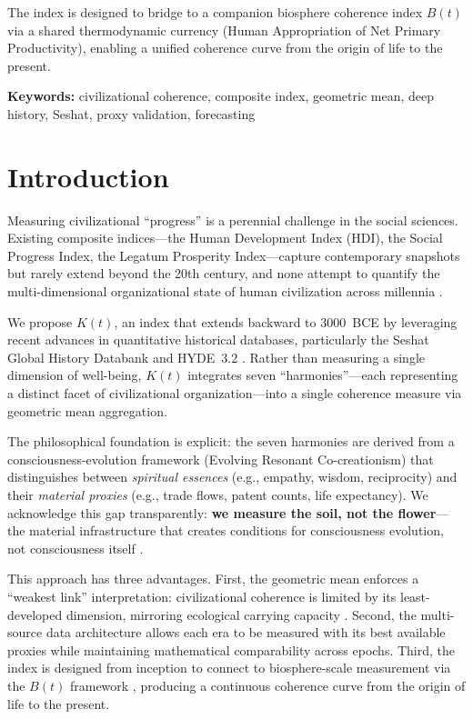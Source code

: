 \documentclass[10pt,letterpaper]{article}
\newcommand{\kt}{$K(t)$}
\begin{document}
The index is designed to bridge to a companion biosphere coherence
index $B(t)$ \cite{stoltz2026bt} via a shared thermodynamic currency
(Human Appropriation of Net Primary Productivity), enabling a unified
coherence curve from the origin of life to the present.

\noindent\textbf{Keywords:} civilizational coherence, composite index,
geometric mean, deep history, Seshat, proxy validation, forecasting

\linenumbers

\section*{Introduction}

Measuring civilizational ``progress'' is a perennial challenge in the
social sciences. Existing composite indices---the Human Development
Index (HDI), the Social Progress Index, the Legatum Prosperity Index---capture
contemporary snapshots but rarely extend beyond the 20th century, and none
attempt to quantify the multi-dimensional organizational state of human
civilization across millennia \cite{undp2020, porter2017}.

We propose \kt{}, an index that extends backward to 3000~BCE by
leveraging recent advances in quantitative historical databases,
particularly the Seshat Global History Databank \cite{turchin2018seshat}
and HYDE~3.2 \cite{goldewijk2017}. Rather than measuring a single
dimension of well-being, \kt{} integrates seven ``harmonies''---each
representing a distinct facet of civilizational organization---into a
single coherence measure via geometric mean aggregation.

The philosophical foundation is explicit: the seven harmonies are
derived from a consciousness-evolution framework (Evolving Resonant
Co-creationism) that distinguishes between \emph{spiritual essences}
(e.g., empathy, wisdom, reciprocity) and their \emph{material proxies}
(e.g., trade flows, patent counts, life expectancy). We acknowledge this
gap transparently: \textbf{we measure the soil, not the flower}---the
material infrastructure that creates conditions for consciousness
evolution, not consciousness itself \cite{stoltz2026bt}.

This approach has three advantages. First, the geometric mean enforces
a ``weakest link'' interpretation: civilizational coherence is limited
by its least-developed dimension, mirroring ecological carrying capacity
\cite{liebig1840}. Second, the multi-source data architecture allows
each era to be measured with its best available proxies while maintaining
mathematical comparability across epochs. Third, the index is designed
from inception to connect to biosphere-scale measurement via the
$B(t)$ framework \cite{stoltz2026bt}, producing a continuous coherence
curve from the origin of life to the present.
\end{document}
